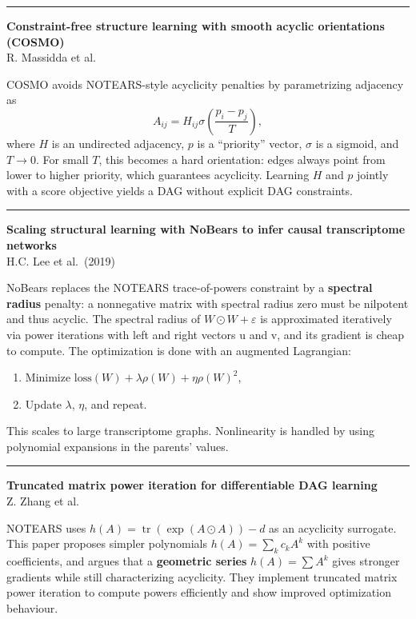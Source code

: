 \documentclass[a5paper]{article}
\providecommand{\tightlist}{%
  \setlength{\itemsep}{0pt}\setlength{\parskip}{0pt}}
\begin{document}
\begin{center}\rule{0.5\linewidth}{0.5pt}\end{center}

\textbf{Constraint-free structure learning with smooth acyclic
orientations (COSMO)}\\
R. Massidda et al.

COSMO avoids NOTEARS-style acyclicity penalties by parametrizing
adjacency as
\[ A_{ij} = H_{ij} \sigma \left(\frac{p_i - p_j}{T}\right), \]
where $H$ is an undirected adjacency, $p$ is a ``priority'' vector, $\sigma$ is a
sigmoid, and $T\to 0$. For small $T$, this becomes a hard orientation: edges
always point from lower to higher priority, which guarantees acyclicity.
Learning $H$ and $p$ jointly with a score objective yields a DAG without
explicit DAG constraints.

\begin{center}\rule{0.5\linewidth}{0.5pt}\end{center}

\textbf{Scaling structural learning with NoBears to infer causal
transcriptome networks}\\
H.C. Lee et al.~(2019)

NoBears replaces the NOTEARS trace-of-powers constraint by a
\textbf{spectral radius} penalty: a nonnegative matrix with spectral
radius zero must be nilpotent and thus acyclic. The spectral radius of
$W\odot W+\varepsilon$ is approximated iteratively via power iterations with left and
right vectors u and v, and its gradient is cheap to compute. The
optimization is done with an augmented Lagrangian:

\begin{enumerate}
\def\labelenumi{\arabic{enumi}.}
\tightlist
\item
  Minimize $\mathrm{loss}(W)+\lambda\rho(W)+\eta\rho(W)^2$,
\item
  Update $\lambda$, $\eta$, and repeat.
\end{enumerate}

This scales to large transcriptome graphs. Nonlinearity is handled by
using polynomial expansions in the parents' values.

\begin{center}\rule{0.5\linewidth}{0.5pt}\end{center}

\textbf{Truncated matrix power iteration for differentiable DAG
learning}\\
Z. Zhang et al.

NOTEARS uses $h(A) = \operatorname{tr}(\exp(A\odot A)) - d$ as an acyclicity surrogate. This
paper proposes simpler polynomials $h(A)=\sum_k c_k A^k$ with positive
coefficients, and argues that a \textbf{geometric series} $h(A)=\sum A^k$
gives stronger gradients while still characterizing acyclicity. They
implement truncated matrix power iteration to compute powers efficiently
and show improved optimization behaviour.
\end{document}
